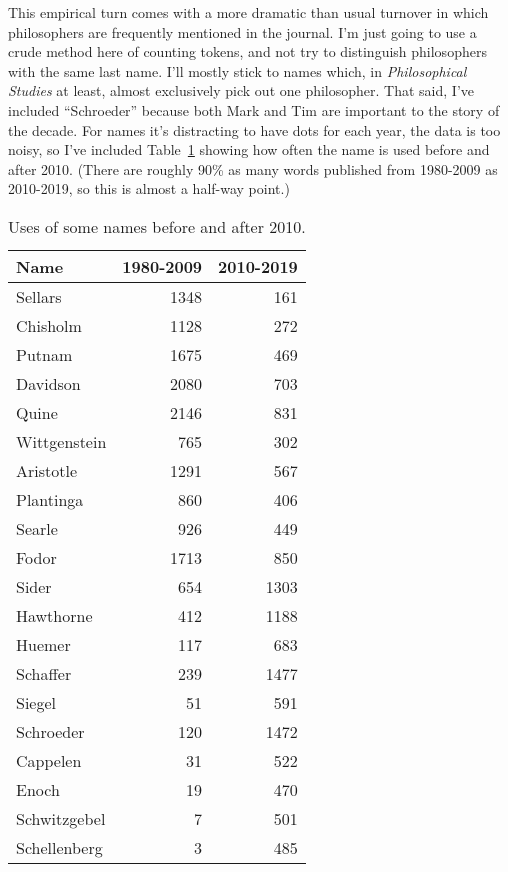 \documentclass[
  11pt,
  letterpaper,
  DIV=11,
  numbers=noendperiod,
  twoside]{scrartcl}
\begin{document}
This empirical turn comes with a more dramatic than usual turnover in
which philosophers are frequently mentioned in the journal. I'm just
going to use a crude method here of counting tokens, and not try to
distinguish philosophers with the same last name. I'll mostly stick to
names which, in \emph{Philosophical Studies} at least, almost
exclusively pick out one philosopher. That said, I've included
``Schroeder'' because both Mark and Tim are important to the story of
the decade. For names it's distracting to have dots for each year, the
data is too noisy, so I've included Table~\ref{tbl-names-early-late}
showing how often the name is used before and after 2010. (There are
roughly 90\% as many words published from 1980-2009 as 2010-2019, so
this is almost a half-way point.)

\begin{longtable}[]{@{}lrr@{}}

\caption{\label{tbl-names-early-late}Uses of some names before and after
2010.}

\tabularnewline

\toprule\noalign{}
Name & 1980-2009 & 2010-2019 \\
\midrule\noalign{}
\endhead
\bottomrule\noalign{}
\endlastfoot
Sellars & 1348 & 161 \\
Chisholm & 1128 & 272 \\
Putnam & 1675 & 469 \\
Davidson & 2080 & 703 \\
Quine & 2146 & 831 \\
Wittgenstein & 765 & 302 \\
Aristotle & 1291 & 567 \\
Plantinga & 860 & 406 \\
Searle & 926 & 449 \\
Fodor & 1713 & 850 \\
Sider & 654 & 1303 \\
Hawthorne & 412 & 1188 \\
Huemer & 117 & 683 \\
Schaffer & 239 & 1477 \\
Siegel & 51 & 591 \\
Schroeder & 120 & 1472 \\
Cappelen & 31 & 522 \\
Enoch & 19 & 470 \\
Schwitzgebel & 7 & 501 \\
Schellenberg & 3 & 485 \\

\end{longtable}
\end{document}
